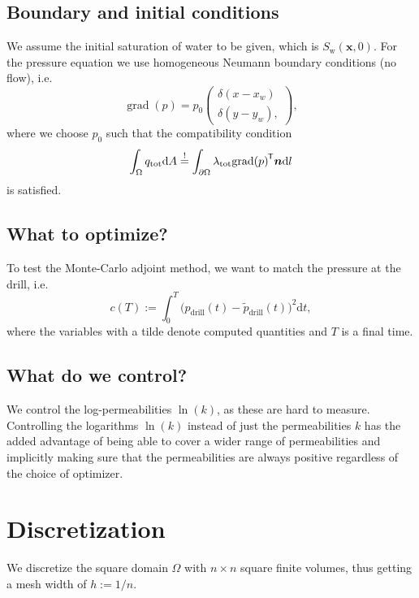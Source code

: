 \documentclass[conference]{IEEEtran}
\DeclareMathOperator*{\grad}{grad}
\renewcommand*{\d}[1]{\ensuremath{\mathrm{d}#1}}
\renewcommand*{\vec}[1]{\ensuremath{{\bm{#1}}}}
\newcommand*{\transpose}[1]{{#1}^{\mkern-1.5mu\mathsf{T}}}
\newcommand*{\iprod}[3]{\ensuremath{\ifstrempty{#1}{\transpose{#2} {#3}}{\transpose{#1} {#2} {#3}}}}
\begin{document}
\subsection{Boundary and initial conditions}
We assume the initial saturation of water to be given,
which is $S_\text{w}(\vec{x}, 0).$
For the pressure equation we use homogeneous Neumann boundary conditions (no flow), i.e.
\begin{equation}
\grad(p) = p_0 \begin{pmatrix} \delta(x - x_w) \\ \delta(y - y_w), \end{pmatrix},
\end{equation}
where we choose $p_0$ such that the compatibility condition
\begin{equation}
\int_\Omega q_\text{tot} \d{A} \overset{!}{=} \int_{\partial\Omega} \lambda_\text{tot} \iprod{}{\grad(p)}{\vec{n}} \d{l}
\end{equation}
is satisfied.

\subsection{What to optimize?}
To test the Monte-Carlo adjoint method, we want to match the pressure at the drill, i.e.
\begin{equation}
\label{costFunction}
c(T) := \int_0^T \biggr(p_\text{drill}(t) - \tilde{p}_\text{drill}(t)\biggr)^2 \d{t},
\end{equation}
where the variables with a tilde denote computed quantities and $T$ is a final time.

\subsection{What do we control?}
We control the log-permeabilities $\ln(k)$, as these are hard to measure.
Controlling the logarithms $\ln(k)$ instead of just the permeabilities $k$ has the added advantage of being able to cover a wider range of permeabilities and implicitly making sure that the permeabilities are always positive regardless of the choice of optimizer.

\section{Discretization}
We discretize the square domain $\Omega$ with $n \times n$ square finite volumes, thus getting a mesh width of $h := 1/n$.
\end{document}
